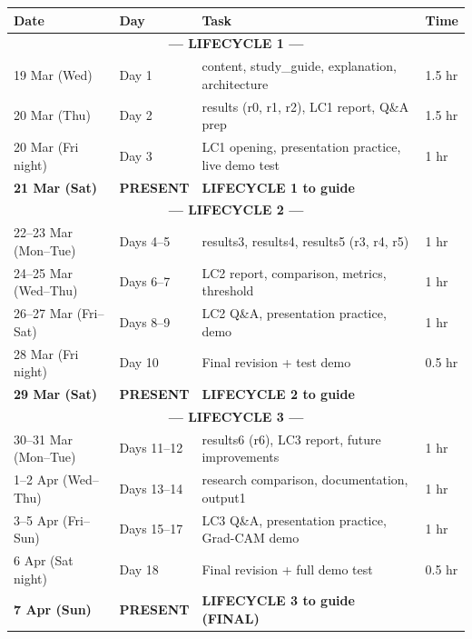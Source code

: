 \documentclass[12pt,a4paper]{article}
\begin{document}
\begin{center}
\renewcommand{\arraystretch}{1.25}
\small
\begin{tabular}{llll}
    \toprule
    \textbf{Date} & \textbf{Day} & \textbf{Task} & \textbf{Time} \\
    \midrule
    \multicolumn{4}{c}{\cellcolor{lc1}\textbf{--- LIFECYCLE 1 ---}} \\
    19 Mar (Wed) & Day 1 & content, study\_guide, explanation, architecture & 1.5 hr \\
    20 Mar (Thu) & Day 2 & results (r0, r1, r2), LC1 report, Q\&A prep & 1.5 hr \\
    20 Mar (Fri night) & Day 3 & LC1 opening, presentation practice, live demo test & 1 hr \\
    \rowcolor{lc1} \textbf{21 Mar (Sat)} & \textbf{PRESENT} & \textbf{LIFECYCLE 1 to guide} & \\
    \midrule
    \multicolumn{4}{c}{\cellcolor{lc2}\textbf{--- LIFECYCLE 2 ---}} \\
    22--23 Mar (Mon--Tue) & Days 4--5 & results3, results4, results5 (r3, r4, r5) & 1 hr \\
    24--25 Mar (Wed--Thu) & Days 6--7 & LC2 report, comparison, metrics, threshold & 1 hr \\
    26--27 Mar (Fri--Sat) & Days 8--9 & LC2 Q\&A, presentation practice, demo & 1 hr \\
    28 Mar (Fri night) & Day 10 & Final revision + test demo & 0.5 hr \\
    \rowcolor{lc2} \textbf{29 Mar (Sat)} & \textbf{PRESENT} & \textbf{LIFECYCLE 2 to guide} & \\
    \midrule
    \multicolumn{4}{c}{\cellcolor{lc3}\textbf{--- LIFECYCLE 3 ---}} \\
    30--31 Mar (Mon--Tue) & Days 11--12 & results6 (r6), LC3 report, future improvements & 1 hr \\
    1--2 Apr (Wed--Thu) & Days 13--14 & research comparison, documentation, output1 & 1 hr \\
    3--5 Apr (Fri--Sun) & Days 15--17 & LC3 Q\&A, presentation practice, Grad-CAM demo & 1 hr \\
    6 Apr (Sat night) & Day 18 & Final revision + full demo test & 0.5 hr \\
    \rowcolor{lc3} \textbf{7 Apr (Sun)} & \textbf{PRESENT} & \textbf{LIFECYCLE 3 to guide (FINAL)} & \\
    \bottomrule
\end{tabular}
\end{center}
\end{document}
